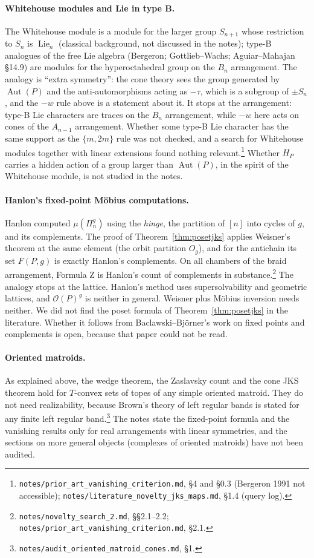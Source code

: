 \documentclass[11pt]{article}
\theoremstyle{definition}
\theoremstyle{remark}
\newcommand{\OP}{\mathcal O}
\newcommand{\Aut}{\operatorname{Aut}}
\newcommand{\Lie}{\operatorname{Lie}}
\newcommand{\src}[1]{\nolinkurl{#1}}
\begin{document}
\paragraph{Whitehouse modules and Lie in type B.} The Whitehouse module
is a module for the larger group $S_{n+1}$ whose restriction to $S_n$ is
$\Lie_n$ (classical background, not discussed in the notes); type-B analogues
of the free Lie algebra (Bergeron; Gottlieb--Wachs; Aguiar--Mahajan
\S14.9) are modules for the hyperoctahedral group on the $B_n$ arrangement.
The analogy is ``extra symmetry'': the cone theory sees the group generated
by $\Aut(P)$ and the anti-automorphisms acting as $-\tau$, which is a subgroup
of $\pm S_n$, and the $-w$ rule above is a statement about it. It stops at the
arrangement: type-B Lie characters are traces on the $B_n$ arrangement, while
$-w$ here acts on cones of the $A_{n-1}$ arrangement. Whether some type-B Lie
character has the same support as the $\{m,2m\}$ rule was not checked, and a
search for Whitehouse modules together with linear extensions found nothing
relevant.\footnote{\src{notes/prior_art_vanishing_criterion.md}, \S4 and
\S0.3 (Bergeron 1991 not accessible);
\src{notes/literature_novelty_jks_maps.md}, \S1.4 (query log).} Whether $H_P$
carries a hidden action of a group larger than $\Aut(P)$, in the spirit of
the Whitehouse module, is not studied in the notes.

\paragraph{Hanlon's fixed-point M\"obius computations.} Hanlon computed
$\mu(\Pi_n^g)$ using the \emph{hinge}, the partition of $[n]$ into cycles of
$g$, and its complements. The proof of Theorem~\ref{thm:posetjks} applies
Weisner's theorem at the same element (the orbit partition $O_g$), and for
the antichain its set $F(P,g)$ is exactly Hanlon's complements. On all
chambers of the braid arrangement, Formula Z is Hanlon's count of
complements in substance.\footnote{\src{notes/novelty_search_2.md},
\S\S2.1--2.2; \src{notes/prior_art_vanishing_criterion.md}, \S2.1.} The
analogy stops at the lattice. Hanlon's method uses supersolvability and
geometric lattices, and $\OP(P)^g$ is neither in general. Weisner plus
M\"obius inversion needs neither. We did not find the poset formula of
Theorem~\ref{thm:posetjks} in the literature. Whether it follows from
Baclawski--Bj\"orner's work on fixed points and complements is open, because
that paper could not be read.

\paragraph{Oriented matroids.} As explained above, the wedge theorem, the
Zaslavsky count and the cone JKS theorem hold for $T$-convex sets of topes of
any simple oriented matroid. They do not need realizability, because Brown's
theory of left regular bands is stated for any finite left regular
band.\footnote{\src{notes/audit_oriented_matroid_cones.md}, \S1.} The notes
state the fixed-point formula and the vanishing results only for real
arrangements with linear symmetries, and the sections on more general
objects (complexes of oriented matroids) have not been audited.
\end{document}
